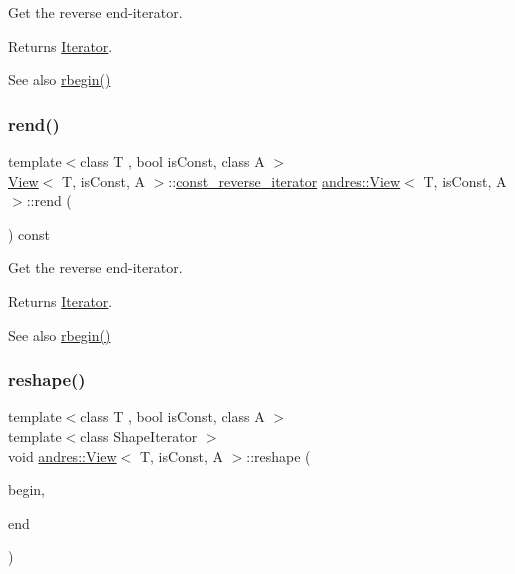 Get the reverse end-\/iterator.

\begin{DoxyReturn}{Returns}
\hyperlink{classandres_1_1Iterator}{Iterator}. 
\end{DoxyReturn}
\begin{DoxySeeAlso}{See also}
\hyperlink{classandres_1_1View_a035fa9d7c83683bfbfb9141251336ba5}{rbegin()} 
\end{DoxySeeAlso}
\mbox{\label{classandres_1_1View_aa1e69b1fadf6ed6b73802cf0e01e3254}} 
\subsubsection{\texorpdfstring{rend()}{rend()}\hspace{0.1cm}{\footnotesize\ttfamily [2/2]}}
{\footnotesize\ttfamily template$<$class T , bool is\+Const, class A $>$ \\
\hyperlink{classandres_1_1View}{View}$<$ T, is\+Const, A $>$\+::\hyperlink{classandres_1_1View_a61656971b73a48c8bf009e3200aad900}{const\+\_\+reverse\+\_\+iterator} \hyperlink{classandres_1_1View}{andres\+::\+View}$<$ T, is\+Const, A $>$\+::rend (\begin{DoxyParamCaption}{ }\end{DoxyParamCaption}) const\hspace{0.3cm}{\ttfamily [inline]}}

Get the reverse end-\/iterator.

\begin{DoxyReturn}{Returns}
\hyperlink{classandres_1_1Iterator}{Iterator}. 
\end{DoxyReturn}
\begin{DoxySeeAlso}{See also}
\hyperlink{classandres_1_1View_a035fa9d7c83683bfbfb9141251336ba5}{rbegin()} 
\end{DoxySeeAlso}
\mbox{\label{classandres_1_1View_a7d0432d097b8ce03a413006ec2fe9469}} 
\subsubsection{\texorpdfstring{reshape()}{reshape()}}
{\footnotesize\ttfamily template$<$class T , bool is\+Const, class A $>$ \\
template$<$class Shape\+Iterator $>$ \\
void \hyperlink{classandres_1_1View}{andres\+::\+View}$<$ T, is\+Const, A $>$\+::reshape (\begin{DoxyParamCaption}\item[{Shape\+Iterator}]{begin,  }\item[{Shape\+Iterator}]{end }\end{DoxyParamCaption})\hspace{0.3cm}{\ttfamily [inline]}}


